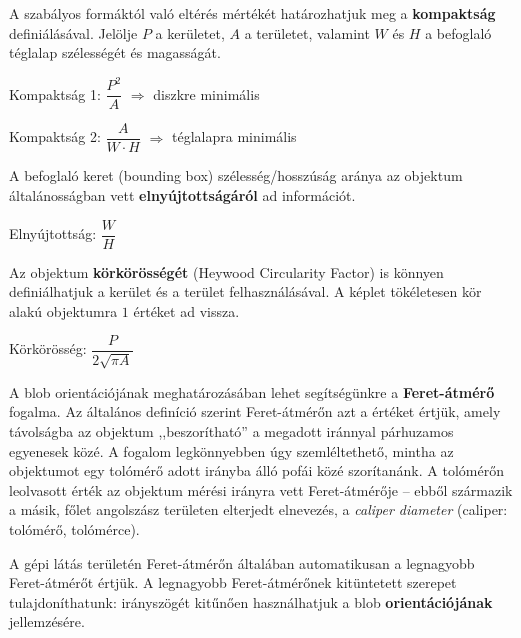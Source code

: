A szabályos formáktól való eltérés mértékét határozhatjuk meg a \textbf{kompaktság} definiálásával. Jelölje $P$ a kerületet, $A$ a területet, valamint $W$ és $H$ a befoglaló téglalap szélességét és magasságát.

\begin{definition}{Kompaktság 1:}
$\dfrac{P^2}{A}$ $\Longrightarrow$ diszkre minimális
\end{definition}

\begin{definition}{Kompaktság 2:}
$\dfrac{A}{W \cdot H}$ $\Longrightarrow$ téglalapra minimális
\end{definition}

\bigskip

A befoglaló keret (bounding box) szélesség/hosszúság aránya az objektum általánosságban vett \textbf{elnyújtottságáról} ad információt. 

\begin{definition}{Elnyújtottság:}
$\dfrac{W}{H}$
\end{definition}

\bigskip

Az objektum \textbf{körkörösségét} (Heywood Circularity Factor) is könnyen definiálhatjuk a kerület és a terület felhasználásával. A képlet tökéletesen kör alakú objektumra $1$ értéket ad vissza.

\begin{definition}{Körkörösség:}
$\dfrac{P}{2 \sqrt{\pi A}}$
\end{definition}

\bigskip

A blob orientációjának meghatározásában lehet segítségünkre a \textbf{Feret-átmérő} fogalma. Az általános definíció szerint Feret-átmérőn azt a értéket értjük, amely távolságba az objektum ,,beszorítható'' a megadott iránnyal párhuzamos egyenesek közé. A fogalom legkönnyebben úgy szemléltethető, mintha az objektumot egy tolómérő adott irányba álló pofái közé szorítanánk. A tolómérőn leolvasott érték az objektum mérési irányra vett Feret-átmérője -- ebből származik a másik, főlet angolszász területen elterjedt elnevezés, a \emph{caliper diameter} (caliper: tolómérő, tolómérce). 

A gépi látás területén Feret-átmérőn általában automatikusan a legnagyobb Feret-átmérőt értjük. A legnagyobb Feret-átmérőnek kitüntetett szerepet tulajdoníthatunk: irányszögét kitűnően használhatjuk a blob \textbf{orientációjának} jellemzésére.

